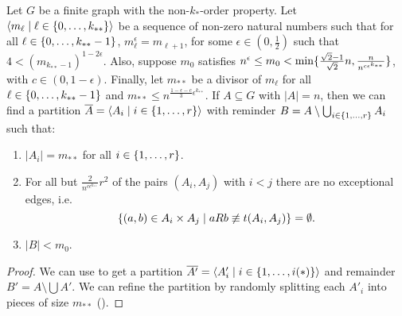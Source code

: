         \begin{lemma} \label{lem:existance_of_equitative_partition_with_bound_exceptional_pairs}
            Let $G$ be a finite graph with the non-$k_{*}$-order property.
            \sloppy Let $\left< m_\ell \mid \ell \in \{ 0, \dots, k_{**} \} \right>$ be a sequence of non-zero natural numbers such that
            for all $\ell \in \{ 0, \dots, k_{**}-1 \}$, $m_\ell^\epsilon = m_{\ell+1}$,
            for some $\epsilon \in (0, \frac{1}{2})$ such that $4 < (m_{k_{**}-1})^{1-2\epsilon}$.
            Also, suppose $m_0$ satisfies $n^\epsilon \leq m_0 < \min \{ \frac{\sqrt{2}-1}{\sqrt{2}} n, \frac{n}{n^{c \epsilon^{k_{**}}}} \}$,
            with $c \in (0, 1-\epsilon)$.
            Finally, let $m_{**}$ be a divisor of $m_\ell$ for all $\ell \in \{ 0, \dots, k_{**}-1 \}$ and
            $m_{**} \leq n^{\frac{1 - \epsilon - c}{3}\epsilon^{k_{**}}}$.
            If $A \subseteq G$ with $|A| = n$, then we can find a partition $\overline{A} = \left< A_i \mid i \in \{ 1, \dots, r \} \right>$
            with reminder $B = A \setminus \bigcup_{i \in \{ 1, \dots, r \}} A_i$ such that:
            \begin{enumerate}[label={\Roman*}., ref={\Roman*}, font=\rmfamily]
                \item \label{itm:existance_of_equitative_partition_with_bound_exceptional_pairs.1} $|A_i| = m_{**}$ for all $i \in \{ 1, \dots, r \}$.
                \item \label{itm:existance_of_equitative_partition_with_bound_exceptional_pairs.2} For all but $\frac{2}{n^{c\epsilon^{k_{**}}}}r^2$ of the pairs
                    $(A_i, A_j)$ with $i<j$ there are no exceptional edges, i.e.
                    \[
                        \{ (a,b) \in A_i \times A_j \mid a R b \not\equiv t(A_i, A_j) \} = \emptyset.
                    \]
                \item \label{itm:existance_of_equitative_partition_with_bound_exceptional_pairs.3} $|B| < m_0$.
            \end{enumerate}
            \begin{proof}
                We can use  to get a partition
                $\overline{A'} = \left< A'_i \mid i \in \{ 1, \dots, i(*) \} \right>$ and remainder $B' = A \setminus \bigcup A'$.
                We can refine the partition by randomly splitting each $A'_i$ into pieces of size $m_{**}$ ().

\end{proof}
\end{lemma}
